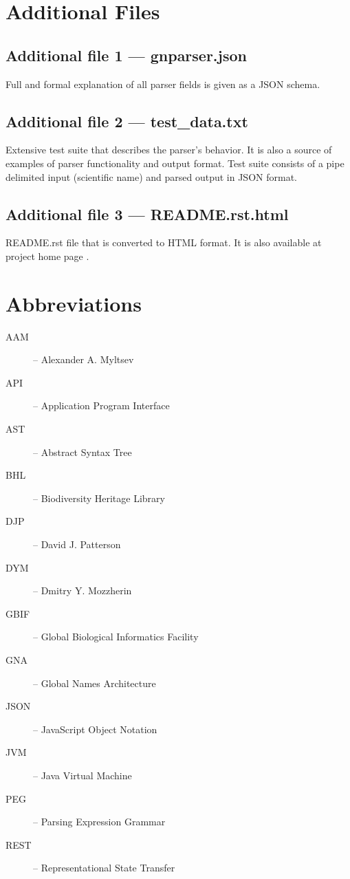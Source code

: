\documentclass{bmcart}
\begin{document}
\section*{Additional Files}

  \subsection*{Additional file 1 --- gnparser.json} Full and formal explanation of all parser fields is given as a JSON schema.

  \subsection*{Additional file 2 --- test\_data.txt} Extensive test suite that describes the parser's behavior. It is also a source of examples of parser functionality and output format.  Test suite consists of a pipe delimited input (scientific name) and parsed output in JSON format.

  \subsection*{Additional file 3 --- README.rst.html} README.rst file that is converted to HTML format. It is also available at project home page \cite{gnparser}.

\section*{Abbreviations}

\begin{description}
  \item[AAM] -- Alexander A. Myltsev
  \item[API] -- Application Program Interface
  \item[AST] -- Abstract Syntax Tree
  \item[BHL] -- Biodiversity Heritage Library
  \item[DJP] -- David J. Patterson
  \item[DYM] -- Dmitry Y. Mozzherin
  \item[GBIF] -- Global Biological Informatics Facility
  \item[GNA] -- Global Names Architecture
  \item[JSON] -- JavaScript Object Notation
  \item[JVM] -- Java Virtual Machine
  \item[PEG] -- Parsing Expression Grammar
  \item[REST] -- Representational State Transfer
\end{description}
\end{document}
